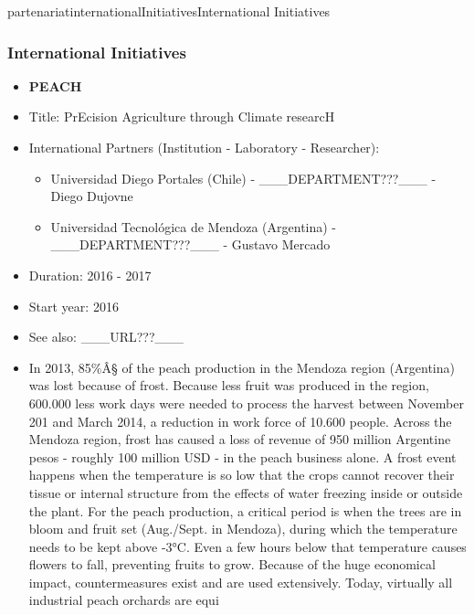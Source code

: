 \documentclass{ra2016}
\begin{document}
\begin{module}{partenariat}{internationalInitiatives}{International Initiatives}
\subsubsection{International Initiatives}

\begin{itemize}
 \item \textbf{ PEACH} 
 \item Title: PrEcision Agriculture through Climate researcH
 \item International Partners (Institution -  Laboratory - Researcher):
 \begin{itemize}
    \item Universidad Diego Portales (Chile)  
 - \_\_\_DEPARTMENT???\_\_\_ - Diego Dujovne
    \item Universidad Tecnológica de Mendoza (Argentina)  
 - \_\_\_DEPARTMENT???\_\_\_ - Gustavo Mercado
 \end{itemize}
 \item Duration: 2016 - 2017
 \item Start year: 2016\item See also: \_\_\_URL???\_\_\_
 \item In 2013, 85\%Â§ of the peach production in the Mendoza region (Argentina) was lost because of frost. Because less fruit was produced in the region, 600.000 less work days were needed to process the harvest between November 201 and March 2014, a reduction in work force of 10.600 people. Across the Mendoza region, frost has caused a loss of revenue of 950 million Argentine pesos - roughly 100 million USD - in the peach business alone.
A frost event happens when the temperature is so low that the crops cannot recover their tissue or internal structure from the effects of water freezing inside or outside the plant. For the peach production, a critical period is when the trees are in bloom and fruit set (Aug./Sept. in Mendoza), during which the temperature needs to be kept above -3°C. Even a few hours below that temperature causes flowers to fall, preventing fruits to grow.
Because of the huge economical impact, countermeasures exist and are used extensively.
Today, virtually all industrial peach orchards are equi 
\end{itemize}


\end{module}
\end{document}
